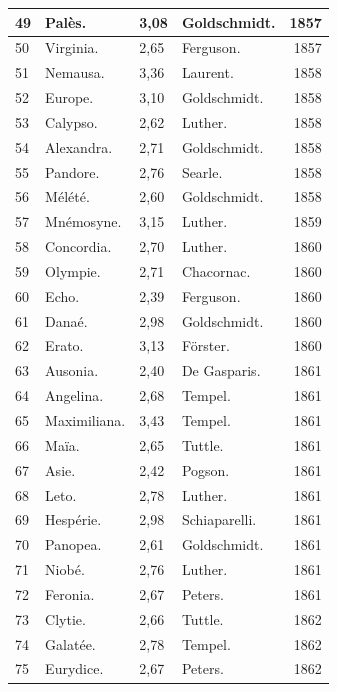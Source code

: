 \documentclass[a4paper, 11pt, oneside, landscape]{article}
\begin{document}
\begin{landscape}
\begin{center}
\begin{longtable}{|p{10mm}|l|p{10mm}|l|r|}
        49 & Palès. & 3,08 & Goldschmidt. & 1857 \\ \hline
        50 & Virginia. & 2,65 & Ferguson. & 1857 \\ \hline
        51 & Nemausa. & 3,36 & Laurent. & 1858 \\ \hline
        52 & Europe. & 3,10 & Goldschmidt. & 1858 \\ \hline
        53 & Calypso. & 2,62 & Luther. & 1858 \\ \hline
        54 & Alexandra. & 2,71 & Goldschmidt. & 1858 \\ \hline
        55 & Pandore. & 2,76 & Searle. & 1858 \\ \hline
        56 & Mélété. & 2,60 & Goldschmidt. & 1858 \\ \hline
        57 & Mnémosyne. & 3,15 & Luther. & 1859 \\ \hline
        58 & Concordia. & 2,70 & Luther. & 1860 \\ \hline
        59 & Olympie. & 2,71 & Chacornac. & 1860 \\ \hline
        60 & Echo. & 2,39 & Ferguson. & 1860 \\ \hline
        61 & Danaé. & 2,98 & Goldschmidt. & 1860 \\ \hline
        62 & Erato. & 3,13 & Förster. & 1860 \\ \hline
        63 & Ausonia. & 2,40 & De Gasparis. & 1861 \\ \hline
        64 & Angelina. & 2,68 & Tempel. & 1861 \\ \hline
        65 & Maximiliana. & 3,43 & Tempel. & 1861 \\ \hline
        66 & Maïa. & 2,65 & Tuttle. & 1861 \\ \hline
        67 & Asie. & 2,42 & Pogson. & 1861 \\ \hline
        68 & Leto. & 2,78 & Luther. & 1861 \\ \hline
        69 & Hespérie. & 2,98 & Schiaparelli. & 1861 \\ \hline
        70 & Panopea. & 2,61 & Goldschmidt. & 1861 \\ \hline
        71 & Niobé. & 2,76 & Luther. & 1861 \\ \hline
        72 & Feronia. & 2,67 & Peters. & 1861 \\ \hline
        73 & Clytie. & 2,66 & Tuttle. & 1862 \\ \hline
        74 & Galatée. & 2,78 & Tempel. & 1862 \\ \hline
        75 & Eurydice. & 2,67 & Peters. & 1862 \\ \hline

\end{longtable}
\end{center}
\end{landscape}
\end{document}
